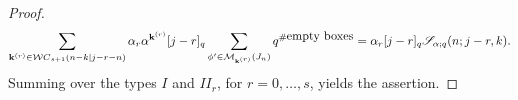 \documentclass[10pt,a4paper]{amsart}
\begin{document}
\begin{proof}
$$
\sum_{{\bf k}^{(r)} \in {\mathcal WC}_{s+1}(n-k|j-r-n)} \alpha_r {\bf  \alpha}^{{\bf k}^{(r)}}[j-r]_q 
\sum_{\phi' \in {\mathcal M}_{{\bf k}^{(r)}}(J_{n})} q^{\# \mbox{empty boxes}}=\alpha_r [j-r]_q {\mathscr S}_{{\bf \alpha};q}(n;j-r,k).
$$
Summing over the types $I$ and $II_r$, for $r=0,\ldots,s$, yields the assertion.
\end{proof}
\end{document}
